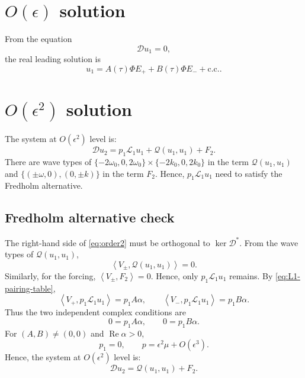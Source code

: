 \documentclass[11pt]{article}
\newcommand{\cQ}{\mathcal{Q}}
\newcommand{\cL}{\mathcal{L}}
\newcommand{\cD}{\mathcal{D}}
\newcommand{\ip}[2]{\left\langle #1,#2\right\rangle}
\newcommand{\cc}{\mathrm{c.c.}}
\DeclareMathOperator{\RePart}{Re}
\begin{document}
\section{$O(\epsilon)$ solution}
From the equation
\[
\cD u_1=0,
\]
the real leading solution is
\begin{equation}
 \boxed{
 u_1=A(\tau)\Phi E_+ +B(\tau)\Phi E_-+\cc.}
 \label{eq:u1}
\end{equation}


\section{$O(\epsilon^2)$ solution}
The system at $O(\epsilon^2)$ level is:
\[
\cD u_2=p_1\cL_1u_1+\cQ(u_1,u_1)+F_2.
\]
There are wave types of $\{-2\omega_0, 0, 2\omega_0\}\times \{-2k_0, 0, 2k_0\}$ in the term $\cQ(u_1,u_1)$ and $\{(\pm \omega, 0), (0,\pm k)\}$ in the term $F_2$. Hence, $p_1\cL_1u_1$ need to satisfy the Fredholm alternative. 

\subsection{Fredholm alternative check}
The right-hand side of \eqref{eq:order2} must be orthogonal to
$\ker\cD^*$. From the wave types of $\cQ(u_1,u_1)$,
\begin{equation}
 \ip{V_\pm}{\cQ(u_1,u_1)}=0.
 \label{eq:Q-second-projection}
\end{equation}
Similarly, for the forcing, $\ip{V_\pm}{F_2}=0$. Hence, only $p_1\cL_1u_1$ remains.  By
\eqref{eq:L1-pairing-table},
\begin{equation}
    \ip{V_+}{p_1\cL_1u_1}=p_1A\alpha,\qquad
 \ip{V_-}{p_1\cL_1u_1}=p_1B\alpha.
 \label{eq:p1-projections}
\end{equation}
Thus the two independent complex conditions are
\begin{equation}
 0=p_1A\alpha,
 \qquad 0=p_1B\alpha.
 \label{eq:p1-conditions}
\end{equation}
For $(A,B)\ne(0,0)$ and $\RePart\alpha>0$,
\begin{equation}
 \boxed{p_1=0,\qquad p=\epsilon^2\mu+O(\epsilon^3).}
 \label{eq:p1-zero}
\end{equation}
Hence, the system at $O(\epsilon^2)$ level is:
\[
\cD u_2=\cQ(u_1,u_1)+F_2.
\]
\end{document}
